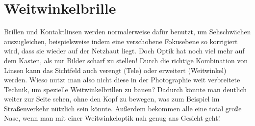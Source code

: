 \documentclass[a5paper,pagesize,10pt,bibtotoc,pointlessnumbers,normalheadings,DIV=9,twoside=false]{scrbook}
\begin{document}


\chapter{Weitwinkelbrille}

Brillen und Kontaktlinsen werden normalerweise dafür benutzt, um Sehschwächen auszugleichen, beispielsweise indem eine verschobene Fokusebene so korrigiert wird, dass sie wieder auf der Netzhaut liegt.
Doch Optik hat noch viel mehr auf dem Kasten, als nur Bilder scharf zu stellen!
Durch die richtige Kombination von Linsen kann das Sichtfeld auch verengt (Tele) oder erweitert (Weitwinkel) werden.
Wieso nutzt man also nicht diese in der Photographie weit verbreitete Technik, um spezielle Weitwinkelbrillen zu bauen?
Dadurch könnte man deutlich weiter zur Seite sehen, ohne den Kopf zu bewegen, was zum Beispiel im Straßenverkehr nützlich sein könnte.
Außerdem bekommen alle eine total große Nase, wenn man mit einer Weitwinkeloptik nah genug ans Gesicht geht!

\end{document}
